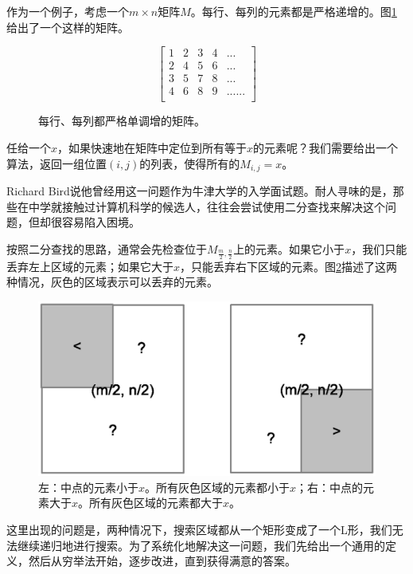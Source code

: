\documentclass[UTF8]{article}
\begin{document}
作为一个例子，考虑一个$m \times n$矩阵$M$。每行、每列的元素都是严格递增的。图\ref{fig:matrix-eg}给出了一个这样的矩阵。

\begin{figure}[htbp]
 \centering
\[
\left [
  \begin{array}{ccccc}
    1 & 2 & 3 & 4 & ... \\
    2 & 4 & 5 & 6 & ... \\
    3 & 5 & 7 & 8 & ... \\
    4 & 6 & 8 & 9 & ...
    ... \\
  \end{array}
\right ]
\]
\caption{每行、每列都严格单调增的矩阵。}
\label{fig:matrix-eg}
\end{figure}

任给一个$x$，如果快速地在矩阵中定位到所有等于$x$的元素呢？我们需要给出一个算法，返回一组位置$(i, j)$的列表，使得所有的$M_{i,j} = x$。

Richard Bird说他曾经用这一问题作为牛津大学的入学面试题\cite{fp-pearls}。耐人寻味的是，那些在中学就接触过计算机科学的候选人，往往会尝试使用二分查找来解决这个问题，但却很容易陷入困境。

按照二分查找的思路，通常会先检查位于$M_{\frac{m}{2}, \frac{n}{2}}$上的元素。如果它小于$x$，我们只能丢弃左上区域的元素；如果它大于$x$，只能丢弃右下区域的元素。图\ref{fig:bsearch-2D}描述了这两种情况，灰色的区域表示可以丢弃的元素。

\begin{figure}[htbp]
 \centering
 \includegraphics[scale=0.5]{img/bsearch-2D.eps}
 \caption{左：中点的元素小于$x$。所有灰色区域的元素都小于$x$；右：中点的元素大于$x$。所有灰色区域的元素都大于$x$。}
 \label{fig:bsearch-2D}
\end{figure}

这里出现的问题是，两种情况下，搜索区域都从一个矩形变成了一个L形，我们无法继续递归地进行搜索。为了系统化地解决这一问题，我们先给出一个通用的定义，然后从穷举法开始，逐步改进，直到获得满意的答案。
\end{document}
